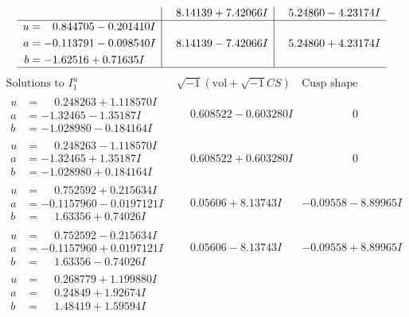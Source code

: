 \documentclass[1p]{elsarticle_modified}
\theoremstyle{definition}
\newcommand{\I}{\sqrt{-1}}
\begin{document}
$$\begin{array}{c|c|c}
 & \phantom{-}8.14139 + 7.42066 I & \phantom{-}5.24860 - 4.23174 I \\ \hline\begin{aligned}
u &= \phantom{-}0.844705 - 0.201410 I \\
a &= -0.113791 - 0.098540 I \\
b &= -1.62516 + 0.71635 I\end{aligned}
 & \phantom{-}8.14139 - 7.42066 I & \phantom{-}5.24860 + 4.23174 I\\
 \hline 
 \end{array}$$\newpage$$\begin{array}{c|c|c}  
\text{Solutions to }I^u_{1}& \I (\text{vol} + \sqrt{-1}CS) & \text{Cusp shape}\\
 \hline 
\begin{aligned}
u &= \phantom{-}0.248263 + 1.118570 I \\
a &= -1.32465 - 1.35187 I \\
b &= -1.028980 - 0.184164 I\end{aligned}
 & \phantom{-}0.608522 - 0.603280 I & \phantom{-0.000000 } 0 \\ \hline\begin{aligned}
u &= \phantom{-}0.248263 - 1.118570 I \\
a &= -1.32465 + 1.35187 I \\
b &= -1.028980 + 0.184164 I\end{aligned}
 & \phantom{-}0.608522 + 0.603280 I & \phantom{-0.000000 } 0 \\ \hline\begin{aligned}
u &= \phantom{-}0.752592 + 0.215634 I \\
a &= -0.1157960 - 0.0197121 I \\
b &= \phantom{-}1.63356 + 0.74026 I\end{aligned}
 & \phantom{-}0.05606 + 8.13743 I & -0.09558 - 8.89965 I \\ \hline\begin{aligned}
u &= \phantom{-}0.752592 - 0.215634 I \\
a &= -0.1157960 + 0.0197121 I \\
b &= \phantom{-}1.63356 - 0.74026 I\end{aligned}
 & \phantom{-}0.05606 - 8.13743 I & -0.09558 + 8.89965 I \\ \hline\begin{aligned}
u &= \phantom{-}0.268779 + 1.199880 I \\
a &= \phantom{-}0.24849 + 1.92674 I \\
b &= \phantom{-}1.48419 + 1.59594 I\end{aligned}

\end{array}$$
\end{document}
